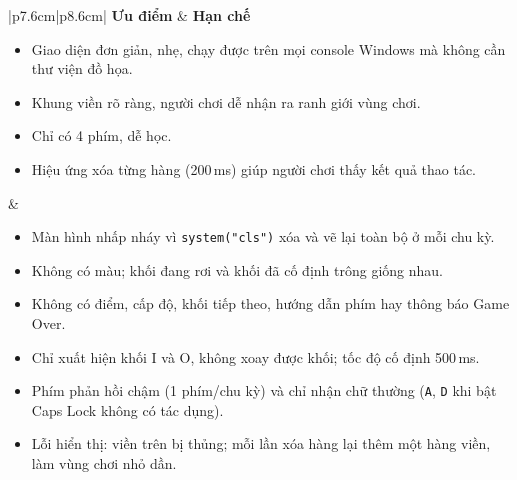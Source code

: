 \begin{table}[H]
    \centering
    \caption{Ưu điểm và hạn chế của giao diện hiện tại}
    \label{tab:ui_danh_gia}
    \renewcommand{\arraystretch}{1.4}
    \begin{tabular}{|p{7.6cm}|p{8.6cm}|}
        \hline
        \textbf{Ưu điểm} & \textbf{Hạn chế} \\
        \hline
        \begin{minipage}[t]{\linewidth}
        \begin{itemize}[leftmargin=*, nosep, before=\vspace{-0.7\baselineskip}]
            \item Giao diện đơn giản, nhẹ, chạy được trên mọi console Windows mà không cần thư viện đồ họa.
            \item Khung viền rõ ràng, người chơi dễ nhận ra ranh giới vùng chơi.
            \item Chỉ có 4 phím, dễ học.
            \item Hiệu ứng xóa từng hàng (200\,ms) giúp người chơi thấy kết quả thao tác.
        \end{itemize}
        \end{minipage}
        &
        \begin{minipage}[t]{\linewidth}
        \begin{itemize}[leftmargin=*, nosep, before=\vspace{-0.7\baselineskip}]
            \item Màn hình nhấp nháy vì \texttt{system("cls")} xóa và vẽ lại toàn bộ ở mỗi chu kỳ.
            \item Không có màu; khối đang rơi và khối đã cố định trông giống nhau.
            \item Không có điểm, cấp độ, khối tiếp theo, hướng dẫn phím hay thông báo Game Over.
            \item Chỉ xuất hiện khối I và O, không xoay được khối; tốc độ cố định 500\,ms.
            \item Phím phản hồi chậm (1 phím/chu kỳ) và chỉ nhận chữ thường (\texttt{A}, \texttt{D} khi bật Caps Lock không có tác dụng).
            \item Lỗi hiển thị: viền trên bị thủng; mỗi lần xóa hàng lại thêm một hàng viền, làm vùng chơi nhỏ dần.
        \end{itemize}
        \vspace{2pt}
        \end{minipage}
        \\
        \hline
    \end{tabular}
\end{table}

